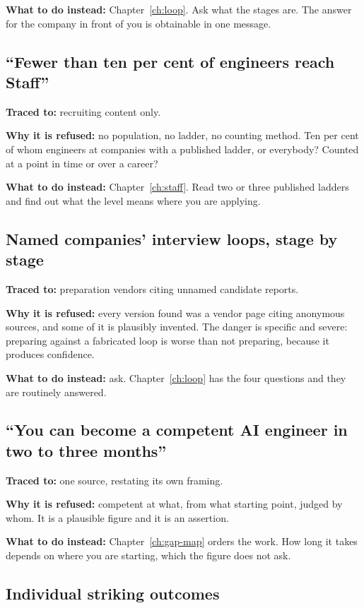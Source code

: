 \textbf{What to do instead:} Chapter~\ref{ch:loop}. Ask what the stages are.
The answer for the company in front of you is obtainable in one message.

\subsection*{``Fewer than ten per cent of engineers reach Staff''}

\textbf{Traced to:} recruiting content only.

\textbf{Why it is refused:} no population, no ladder, no counting method. Ten
per cent of whom \dash{} engineers at companies with a published ladder, or
everybody? Counted at a point in time or over a career?

\textbf{What to do instead:} Chapter~\ref{ch:staff}. Read two or three
published ladders and find out what the level means where you are applying.

\subsection*{Named companies' interview loops, stage by stage}

\textbf{Traced to:} preparation vendors citing unnamed candidate reports.

\textbf{Why it is refused:} every version found was a vendor page citing
anonymous sources, and some of it is plausibly invented. The danger is specific
and severe: preparing against a fabricated loop is worse than not preparing,
because it produces confidence.

\textbf{What to do instead:} ask. Chapter~\ref{ch:loop} has the four questions
and they are routinely answered.

\subsection*{``You can become a competent AI engineer in two to three months''}

\textbf{Traced to:} one source, restating its own framing.

\textbf{Why it is refused:} competent at what, from what starting point, judged
by whom. It is a plausible figure and it is an assertion.

\textbf{What to do instead:} Chapter~\ref{ch:gap-map} orders the work. How long
it takes depends on where you are starting, which the figure does not ask.

\subsection*{Individual striking outcomes}

